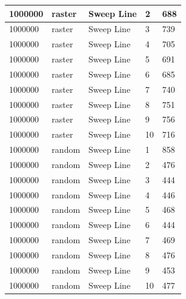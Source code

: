 \documentclass[12pt]{article}
\begin{document}
\begin{longtable}{|l|l|l|l|l|}
1000000      & raster            & Sweep Line & 2          & 688                           \\ \hline
1000000      & raster            & Sweep Line & 3          & 739                           \\ \hline
1000000      & raster            & Sweep Line & 4          & 705                           \\ \hline
1000000      & raster            & Sweep Line & 5          & 691                           \\ \hline
1000000      & raster            & Sweep Line & 6          & 685                           \\ \hline
1000000      & raster            & Sweep Line & 7          & 740                           \\ \hline
1000000      & raster            & Sweep Line & 8          & 751                           \\ \hline
1000000      & raster            & Sweep Line & 9          & 756                           \\ \hline
1000000      & raster            & Sweep Line & 10         & 716                           \\ \hline
1000000      & random            & Sweep Line & 1          & 858                           \\ \hline
1000000      & random            & Sweep Line & 2          & 476                           \\ \hline
1000000      & random            & Sweep Line & 3          & 444                           \\ \hline
1000000      & random            & Sweep Line & 4          & 446                           \\ \hline
1000000      & random            & Sweep Line & 5          & 468                           \\ \hline
1000000      & random            & Sweep Line & 6          & 444                           \\ \hline
1000000      & random            & Sweep Line & 7          & 469                           \\ \hline
1000000      & random            & Sweep Line & 8          & 476                           \\ \hline
1000000      & random            & Sweep Line & 9          & 453                           \\ \hline
1000000      & random            & Sweep Line & 10         & 477                           \\ \hline

\end{longtable}
\end{document}
